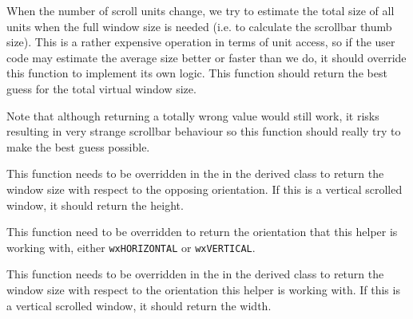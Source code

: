 When the number of scroll units change, we try to estimate the total size of
all units when the full window size is needed (i.e. to calculate the scrollbar
thumb size). This is a rather expensive operation in terms of unit access, so
if the user code may estimate the average size better or faster than we do, it
should override this function to implement its own logic. This function should
return the best guess for the total virtual window size.

Note that although returning a totally wrong value would still work, it risks
resulting in very strange scrollbar behaviour so this function should really
try to make the best guess possible.


\label{wxvarscrollhelperbasegetnonorientationtargetsize}


This function needs to be overridden in the in the derived class to return the
window size with respect to the opposing orientation. If this is a vertical
scrolled window, it should return the height.




\label{wxvarscrollhelperbasegetorientation}


This function need to be overridden to return the orientation that this helper
is working with, either {\tt wxHORIZONTAL} or {\tt wxVERTICAL}.


\label{wxvarscrollhelperbasegetorientationtargetsize}


This function needs to be overridden in the in the derived class to return the
window size with respect to the orientation this helper is working with. If
this is a vertical scrolled window, it should return the width.




\label{wxvarscrollhelperbasegettargetwindow}

